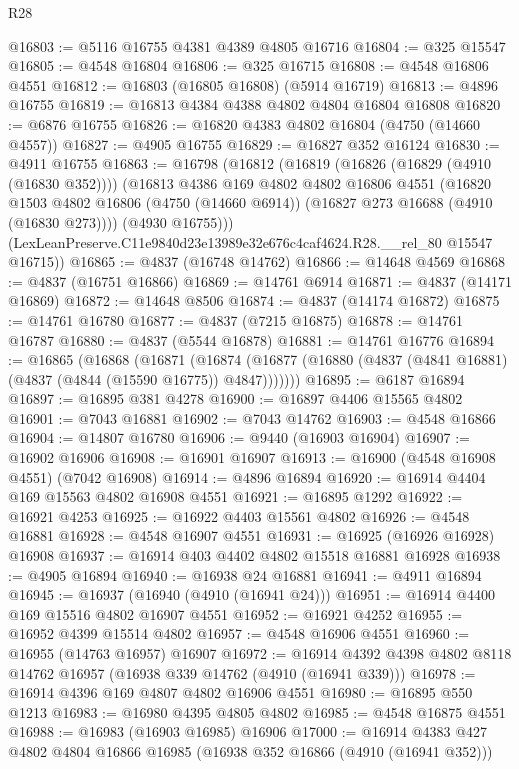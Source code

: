 \begin{lexlean}{R28}
\begin{coremodule}
@16803 := @5116 @16755 @4381 @4389 @4805 @16716
@16804 := @325 @15547
@16805 := @4548 @16804
@16806 := @325 @16715
@16808 := @4548 @16806 @4551
@16812 := @16803 (@16805 @16808) (@5914 @16719)
@16813 := @4896 @16755
@16819 := @16813 @4384 @4388 @4802 @4804 @16804 @16808
@16820 := @6876 @16755
@16826 := @16820 @4383 @4802 @16804 (@4750 (@14660 @4557))
@16827 := @4905 @16755
@16829 := @16827 @352 @16124
@16830 := @4911 @16755
@16863 := @16798
    (@16812
      (@16819
        (@16826 (@16829 (@4910 (@16830 @352))))
        (@16813
          @4386
          @169
          @4802
          @4802
          @16806
          @4551
          (@16820
            @1503
            @4802
            @16806
            (@4750 (@14660 @6914))
            (@16827 @273 @16688 (@4910 (@16830 @273))))
          (@4930 @16755)))
      (LexLeanPreserve.C11e9840d23e13989e32e676c4caf4624.R28.__rel_80 @15547 @16715))
@16865 := @4837 (@16748 @14762)
@16866 := @14648 @4569
@16868 := @4837 (@16751 @16866)
@16869 := @14761 @6914
@16871 := @4837 (@14171 @16869)
@16872 := @14648 @8506
@16874 := @4837 (@14174 @16872)
@16875 := @14761 @16780
@16877 := @4837 (@7215 @16875)
@16878 := @14761 @16787
@16880 := @4837 (@5544 @16878)
@16881 := @14761 @16776
@16894 := @16865
    (@16868
      (@16871
        (@16874 (@16877 (@16880 (@4837 (@4841 @16881) (@4837 (@4844 (@15590 @16775)) @4847)))))))
@16895 := @6187 @16894
@16897 := @16895 @381 @4278
@16900 := @16897 @4406 @15565 @4802
@16901 := @7043 @16881
@16902 := @7043 @14762
@16903 := @4548 @16866
@16904 := @14807 @16780
@16906 := @9440 (@16903 @16904)
@16907 := @16902 @16906
@16908 := @16901 @16907
@16913 := @16900 (@4548 @16908 @4551) (@7042 @16908)
@16914 := @4896 @16894
@16920 := @16914 @4404 @169 @15563 @4802 @16908 @4551
@16921 := @16895 @1292
@16922 := @16921 @4253
@16925 := @16922 @4403 @15561 @4802
@16926 := @4548 @16881
@16928 := @4548 @16907 @4551
@16931 := @16925 (@16926 @16928) @16908
@16937 := @16914 @403 @4402 @4802 @15518 @16881 @16928
@16938 := @4905 @16894
@16940 := @16938 @24 @16881
@16941 := @4911 @16894
@16945 := @16937 (@16940 (@4910 (@16941 @24)))
@16951 := @16914 @4400 @169 @15516 @4802 @16907 @4551
@16952 := @16921 @4252
@16955 := @16952 @4399 @15514 @4802
@16957 := @4548 @16906 @4551
@16960 := @16955 (@14763 @16957) @16907
@16972 := @16914 @4392 @4398 @4802 @8118 @14762 @16957 (@16938 @339 @14762 (@4910 (@16941 @339)))
@16978 := @16914 @4396 @169 @4807 @4802 @16906 @4551
@16980 := @16895 @550 @1213
@16983 := @16980 @4395 @4805 @4802
@16985 := @4548 @16875 @4551
@16988 := @16983 (@16903 @16985) @16906
@17000 := @16914 @4383 @427 @4802 @4804 @16866 @16985 (@16938 @352 @16866 (@4910 (@16941 @352)))

\end{coremodule}
\end{lexlean}
